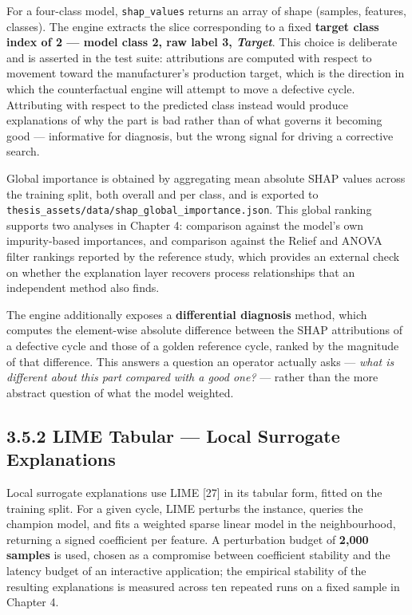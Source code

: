 For a four-class model, \texttt{shap\_values} returns an array of shape (samples, features, classes). The engine extracts the slice corresponding to a fixed \textbf{target class index of 2 --- model class 2, raw label 3, \emph{Target}}. This choice is deliberate and is asserted in the test suite: attributions are computed with respect to movement toward the manufacturer's production target, which is the direction in which the counterfactual engine will attempt to move a defective cycle. Attributing with respect to the predicted class instead would produce explanations of why the part is bad rather than of what governs it becoming good --- informative for diagnosis, but the wrong signal for driving a corrective search.

Global importance is obtained by aggregating mean absolute SHAP values across the training split, both overall and per class, and is exported to \texttt{thesis\_assets/data/shap\_global\_importance.json}. This global ranking supports two analyses in Chapter 4: comparison against the model's own impurity-based importances, and comparison against the Relief and ANOVA filter rankings reported by the reference study, which provides an external check on whether the explanation layer recovers process relationships that an independent method also finds.

The engine additionally exposes a \textbf{differential diagnosis} method, which computes the element-wise absolute difference between the SHAP attributions of a defective cycle and those of a golden reference cycle, ranked by the magnitude of that difference. This answers a question an operator actually asks --- \emph{what is different about this part compared with a good one?} --- rather than the more abstract question of what the model weighted.

\hypertarget{lime-tabular-local-surrogate-explanations}{%
\subsection{3.5.2 LIME Tabular --- Local Surrogate Explanations}\label{lime-tabular-local-surrogate-explanations}}

Local surrogate explanations use LIME {[}27{]} in its tabular form, fitted on the training split. For a given cycle, LIME perturbs the instance, queries the champion model, and fits a weighted sparse linear model in the neighbourhood, returning a signed coefficient per feature. A perturbation budget of \textbf{2,000 samples} is used, chosen as a compromise between coefficient stability and the latency budget of an interactive application; the empirical stability of the resulting explanations is measured across ten repeated runs on a fixed sample in Chapter 4.

